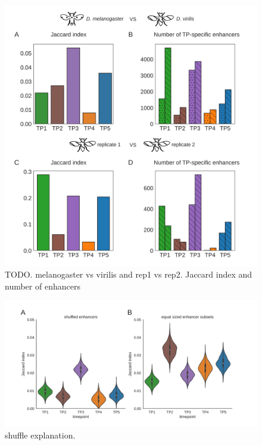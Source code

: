 \begin{figure}[H]
    \includegraphics[width=\linewidth]{ch4.hourglass/images/fly_control_2.png}
    \caption{TODO. melanogaster vs virilis and rep1 vs rep2. Jaccard index and number of enhancers}
    \label{fig:peak_null}
\end{figure}

\begin{figure}[H]
    \includegraphics[width=\linewidth]{ch4.hourglass/images/fly_shuffle.png}
    \caption{shuffle explanation.}
    \label{fig:shuffle}
\end{figure}

